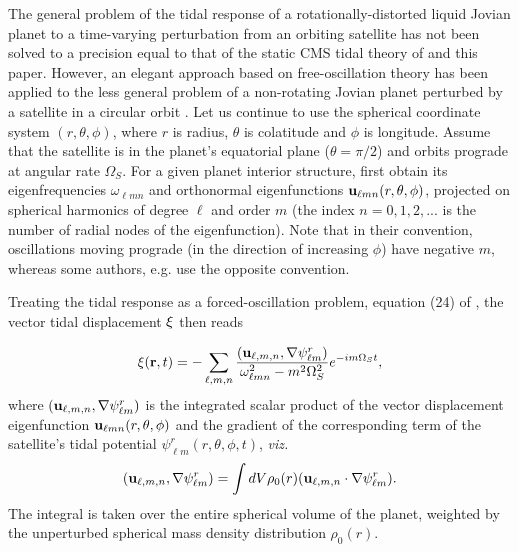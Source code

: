 The general problem of the tidal response of a rotationally-distorted liquid
Jovian planet to a time-varying perturbation from an orbiting satellite
has not been solved to a precision equal to that of the static CMS tidal
theory of \citet{wahl2016} and this paper.  However, an elegant approach
based on free-oscillation theory has been applied to the less general problem
of a non-rotating Jovian planet perturbed by a satellite in a circular orbit
\citep{vorontsov1984}.  Let us continue to use the spherical coordinate system $(r,\theta,\phi)$,
where $r$ is radius, $\theta$ is colatitude and $\phi$ is longitude.
Assume that the satellite is in the planet's equatorial
plane ($\theta=\pi/2$) and orbits prograde at angular rate $\Omega_S$.  For a given planet
interior structure, \citet{vorontsov1984} first obtain its eigenfrequencies
$\omega_{\ell m n}$ and orthonormal
eigenfunctions ${\bf u}_{\ell m n}(r,\theta,\phi)$, projected on spherical harmonics
of degree $\ell$ and order $m$ (the index $n=0,1,2,...$ is the number of radial nodes
of the eigenfunction).  Note that in their convention, oscillations moving prograde
(in the direction of increasing $\phi$) have negative $m$, whereas some authors, e.g.
\citet{marley1993} use the opposite convention.

Treating the tidal response as a forced-oscillation problem, equation (24) of
\citet{vorontsov1984}, the vector tidal displacement ${\bf \xi}$ then reads

\begin{equation}
    {\bf \xi}({\bf r},t) = -\sum_{\ell,m,n} {{({\bf u}_{\ell,m,n},{\bf \nabla}\psi^r_{\ell m})}
\over {\omega^2_{\ell m n} - m^2 \Omega_S^2}} e^{-i m \Omega_S t},
\label{eq:xioft}
\end{equation}
where $({\bf u}_{\ell,m,n},{\bf \nabla} \psi^r_{\ell m})$ is the integrated scalar product of the
vector displacement eigenfunction ${\bf u}_{\ell m n}(r,\theta,\phi)$ and the
gradient of the corresponding term of the satellite's tidal potential
$\psi^r_{\ell m}(r,\theta,\phi,t)$, {\it viz.}
\begin{equation}
    ({\bf u}_{\ell,m,n},{\bf \nabla} \psi^r_{\ell m})=
\int dV \rho_0(r) ({\bf u}_{\ell,m,n} \cdot {\bf \nabla} \psi^r_{\ell m}).
\label{eq:scalprod}
\end{equation}
The integral is taken over the entire spherical volume of the planet,
weighted by the unperturbed spherical mass density distribution $\rho_0(r)$.

